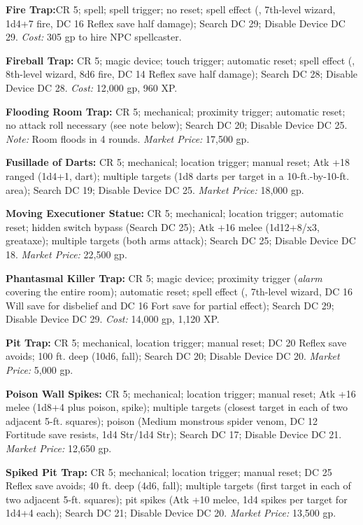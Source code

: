 \textbf{Fire Trap:}CR 5; spell; spell trigger; no reset; spell effect 
(, 7th-level wizard, 1d4+7 fire, DC 16 Reflex save half damage); 
Search DC 29; Disable Device DC 29. \textit{Cost:} 305 gp to hire NPC spellcaster.

\textbf{Fireball Trap:} CR 5; magic device; touch trigger; automatic 
reset; spell effect (, 8th-level wizard, 8d6 fire, DC 14 Reflex 
save half damage); Search DC 28; Disable Device DC 28. \textit{Cost:} 12,000 gp, 
960 XP.

\textbf{Flooding Room Trap:} CR 5; mechanical; proximity trigger; automatic reset; 
no attack roll necessary (see note below); Search DC 20; Disable Device DC 25. 
\textit{Note:} Room floods in 4 rounds. \textit{Market Price:} 17,500 gp.

\textbf{Fusillade of Darts:} CR 5; mechanical; location trigger; manual reset; 
Atk +18 ranged (1d4+1, dart); multiple targets (1d8 darts per target in a 10-ft.-by-10-ft. 
area); Search DC 19; Disable Device DC 25. \textit{Market Price:} 18,000 gp.

\textbf{Moving Executioner Statue:} CR 5; mechanical; location trigger; automatic 
reset; hidden switch bypass (Search DC 25); Atk +16 melee (1d12+8/x3, greataxe); 
multiple targets (both arms attack); Search DC 25; Disable Device DC 18. \textit{Market 
Price:} 22,500 gp.

\textbf{Phantasmal Killer Trap:} CR 5; magic device; proximity 
trigger (\textit{alarm }covering the entire room); automatic reset; spell effect 
(, 7th-level wizard, DC 16 Will save for disbelief and 
DC 16 Fort save for partial effect); Search DC 29; Disable Device DC 29. \textit{Cost: 
}14,000 gp, 1,120 XP.

\textbf{Pit Trap:} CR 5; mechanical, location trigger; manual reset; DC 20 Reflex 
save avoids; 100 ft. deep (10d6, fall); Search DC 20; Disable Device DC 20. \textit{Market 
Price:} 5,000 gp.

\textbf{Poison Wall Spikes:} CR 5; mechanical; location trigger; manual reset; 
Atk +16 melee (1d8+4 plus poison, spike); multiple targets (closest target in each 
of two adjacent 5-ft. squares); poison (Medium monstrous spider venom, DC 12 Fortitude 
save resists, 1d4 Str/1d4 Str); Search DC 17; Disable Device DC 21. \textit{Market 
Price:} 12,650 gp.

\textbf{Spiked Pit Trap:} CR 5; mechanical; location trigger; manual reset; DC 
25 Reflex save avoids; 40 ft. deep (4d6, fall); multiple targets (first target 
in each of two adjacent 5-ft. squares); pit spikes (Atk +10 melee, 1d4 spikes per 
target for 1d4+4 each); Search DC 21; Disable Device DC 20. \textit{Market Price: 
}13,500 gp.

